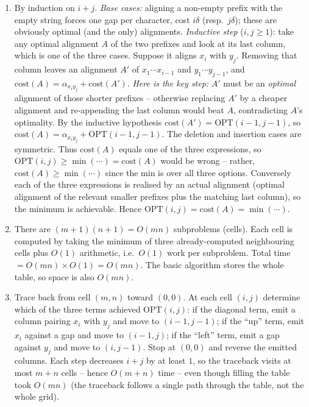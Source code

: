 \documentclass[11pt]{article}
\begin{document}
\begin{enumerate}[label=\textbf{A\arabic*.}, leftmargin=2.2em]
\item By induction on $i+j$. \emph{Base cases:} aligning a non-empty prefix with the empty
string forces one gap per character, cost $i\delta$ (resp.\ $j\delta$); these are obviously
optimal (and the only) alignments. \emph{Inductive step} ($i,j\ge 1$): take any optimal
alignment $A$ of the two prefixes and look at its last column, which is one of the three
cases. Suppose it aligns $x_i$ with $y_j$. Removing that column leaves an alignment $A'$ of
$x_1\cdots x_{i-1}$ and $y_1\cdots y_{j-1}$, and $\mathrm{cost}(A) = \alpha_{x_i y_j} +
\mathrm{cost}(A')$. \emph{Here is the key step:} $A'$ must be an \emph{optimal} alignment of
those shorter prefixes -- otherwise replacing $A'$ by a cheaper alignment and re-appending
the last column would beat $A$, contradicting $A$'s optimality. By the inductive hypothesis
$\mathrm{cost}(A') = \mathrm{OPT}(i-1,j-1)$, so $\mathrm{cost}(A) = \alpha_{x_i y_j} +
\mathrm{OPT}(i-1,j-1)$. The deletion and insertion cases are symmetric. Thus
$\mathrm{cost}(A)$ equals one of the three expressions, so $\mathrm{OPT}(i,j) \ge \min(\cdots)
= \mathrm{cost}(A)$ would be wrong -- rather, $\mathrm{cost}(A) \ge \min(\cdots)$ since the
min is over all three options. Conversely each of the three expressions is realised by an
actual alignment (optimal alignment of the relevant smaller prefixes plus the matching last
column), so the minimum is achievable. Hence $\mathrm{OPT}(i,j) = \mathrm{cost}(A) =
\min(\cdots)$.

\item There are $(m+1)(n+1) = O(mn)$ subproblems (cells). Each cell is computed by taking
the minimum of three already-computed neighbouring cells plus $O(1)$ arithmetic, i.e.\
$O(1)$ work per subproblem. Total time $= O(mn) \times O(1) = O(mn)$. The basic algorithm
stores the whole table, so space is also $O(mn)$.

\item Trace back from cell $(m,n)$ toward $(0,0)$. At each cell $(i,j)$ determine which of
the three terms achieved $\mathrm{OPT}(i,j)$: if the diagonal term, emit a column pairing
$x_i$ with $y_j$ and move to $(i-1,j-1)$; if the ``up'' term, emit $x_i$ against a gap and
move to $(i-1,j)$; if the ``left'' term, emit a gap against $y_j$ and move to $(i,j-1)$.
Stop at $(0,0)$ and reverse the emitted columns. Each step decreases $i+j$ by at least $1$,
so the traceback visits at most $m+n$ cells -- hence $O(m+n)$ time -- even though filling the
table took $O(mn)$ (the traceback follows a single path through the table, not the whole
grid).


\end{enumerate}
\end{document}
